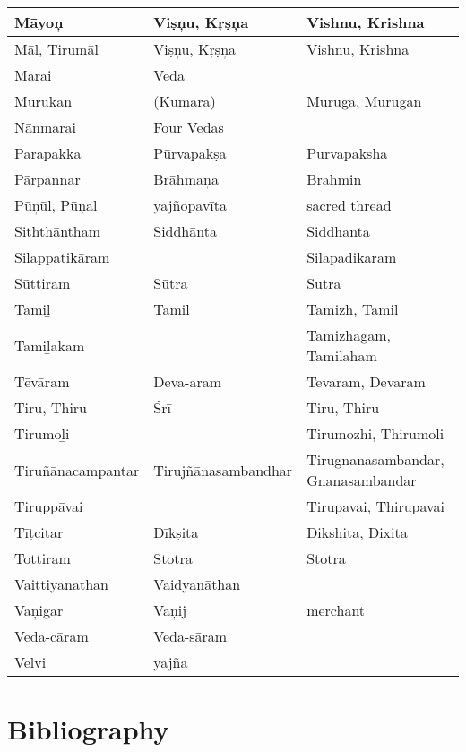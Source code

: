 \begin{longtable}{|p{2.5cm}|p{2.5cm}|p{3cm}|}
\hline
Māyoņ & Viṣņu, Kŗṣņa & Vishnu, Krishna \\
\hline
Māl, Tirumāl & Viṣņu, Kŗṣņa & Vishnu, Krishna \\
\hline
Marai & Veda &  \\
\hline
Murukan & (Kumara) & Muruga, Murugan \\
\hline
Nānmarai & Four Vedas &  \\
\hline
Parapakka & Pūrvapakṣa\index{Purvapaksa@Pūrvapakṣa} & Purvapaksha \\
\hline
Pārpannar & Brāhmaņa & Brahmin \\
\hline
Pūņūl, Pūņal & yajñopavīta & sacred thread \\
\hline
Siththāntham & Siddhānta & Siddhanta \\
\hline
Silappatikāram &  & Silapadikaram \\
\hline
Sūttiram & Sūtra & Sutra \\
\hline
Tamiḻ & Tamil & Tamizh, Tamil \\
\hline
Tamiḻakam &  & Tamizhagam, Tamilaham \\
\hline
Tēvāram & Deva-aram & Tevaram, Devaram \\
\hline
Tiru, Thiru & Śrī & Tiru, Thiru \\
\hline
Tirumoḻi &  & Tirumozhi, Thirumoli \\
\hline
Tiruñānacampan\-tar & Tirujñānasam\-bandhar & Tirugnanasambandar, Gnanasambandar \\
\hline
Tiruppāvai &  & Tirupavai, Thirupavai \\
\hline
Tīṭcitar & Dīkṣita & Dikshita, Dixita \\
\hline
Tottiram & Stotra & Stotra \\
\hline
Vaittiyanathan & Vaidyanāthan &  \\
\hline
Vaņigar & Vaņij & merchant \\
\hline
Veda-cāram & Veda-sāram  &  \\
\hline
Velvi & yajña &  \\
\hline
\end{longtable}


\section*{Bibliography}

